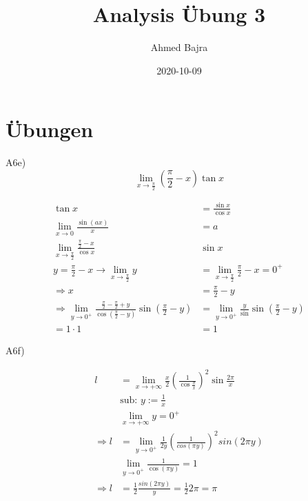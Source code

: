 \documentclass{article}
\title{Analysis Übung 3}
\author{Ahmed Bajra}
\date{2020-10-09}
\begin{document}
    \maketitle

    \section{Übungen}
    A6e) \[\lim_{x\to\frac\pi2}(\frac\pi2-x)\tan x \]

    \begin{align*}
        \tan x &= \frac{\sin x}{\cos x} \\
        \lim_{x\to0}\frac{\sin (ax)}{x} &= a\\
        \lim_{x\to\frac\pi2}\frac{\frac\pi2 -x}{\cos x}&\sin x \\
        y=\frac\pi2-x \rightarrow \lim_{x\to\frac\pi2}y&=\lim_{x \to \frac\pi2}\frac\pi2 - x = 0^+ \\
        \Rightarrow x &=\frac\pi2 - y \\
        \Rightarrow \lim_{y\to0^+}\frac{\frac\pi2-\frac\pi2 + y}{\cos (\frac\pi2 - y)}\sin (\frac\pi2-y)&=\lim_{y\to0^+}\frac{y}{\sin}\sin (\frac\pi2 - y)\\
        = 1\cdot1&=1
    \end{align*}

    A6f)

    \begin{align*}
        l &= \lim_{x\to+\infty}\frac{x}2\left(\frac1{\cos\frac\pi{x}}\right)^2\sin\frac{2\pi}{x}\\
        &\text{sub: }y:=\frac1x \\
        &\lim_{x\to+\infty}y=0^+\\
        \Rightarrow l &= \lim_{y\to 0^+}\frac1{2y}\left(\frac1{cos (\pi y)}\right)^2 sin(2\pi y)\\
        &\lim_{y\to 0^+}\frac1{\cos (\pi y)} = 1\\
        \Rightarrow l& = \frac12\frac{sin(2\pi y)}{y} = \frac12 2\pi = \pi
    \end{align*}

    \newpage

    
\end{document}
